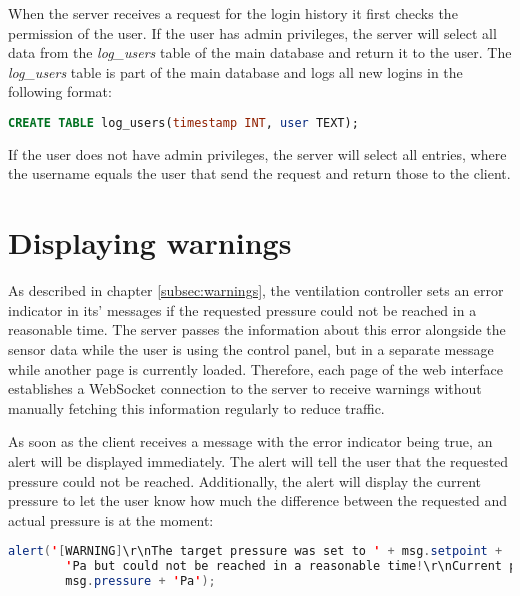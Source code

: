 When the server receives a request for the login history it first checks the permission of the user. If the user has admin privileges, the server will select all data from the \textit{log\_users} table of the main database and return it to the user.  The \textit{log\_users} table is part of the main database and logs all new logins in the following format:

\begin{lstlisting}[label = lst:log_users, language = SQL, numbers = none]
 CREATE TABLE log_users(timestamp INT, user TEXT);
\end{lstlisting}

If the user does not have admin privileges, the server will select all entries, where the username equals the user that send the request and return those to the client.





\section{Displaying warnings}
\label{sec:displaying_warnings}

As described in chapter \ref{subsec:warnings}, the ventilation controller sets an error indicator in its' messages if the requested pressure could not be reached in a reasonable time. The server passes the information about this error alongside the sensor data while the user is using the control panel, but in a separate message while another page is currently loaded. Therefore, each page of the web interface establishes a WebSocket connection to the server to receive warnings without manually fetching this information regularly to reduce traffic.

As soon as the client receives a message with the error indicator being true, an alert will be displayed immediately.  The alert will tell the user that the requested pressure could not be reached. Additionally, the alert will display the current pressure to let the user know how much the difference between the requested and actual pressure is at the moment:

\begin{lstlisting}[label = lst:log_users, language = Java, numbers = none]
 alert('[WARNING]\r\nThe target pressure was set to ' + msg.setpoint + 
 		'Pa but could not be reached in a reasonable time!\r\nCurrent pressure: ' + 
 		msg.pressure + 'Pa');
\end{lstlisting}

